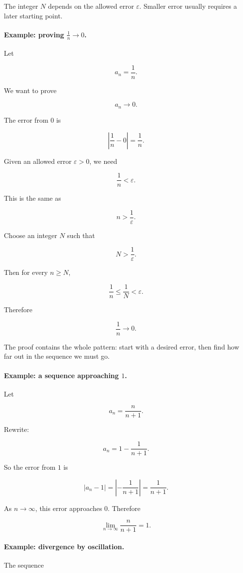 The integer \(N\) depends on the allowed error \(\varepsilon\).  Smaller error usually
requires a later starting point.

\paragraph{Example: proving \(\frac1n\to0\).}
Let

\[
a_n=\frac1n.
\]

We want to prove

\[
a_n\to0.
\]

The error from \(0\) is

\[
\left|\frac1n-0\right|=\frac1n.
\]

Given an allowed error \(\varepsilon>0\), we need

\[
\frac1n<\varepsilon.
\]

This is the same as

\[
n>\frac1\varepsilon.
\]

Choose an integer \(N\) such that

\[
N>\frac1\varepsilon.
\]

Then for every \(n\ge N\),

\[
\frac1n\le \frac1N<\varepsilon.
\]

Therefore

\[
\boxed{
\frac1n\to0.
}
\]

The proof contains the whole pattern: start with a desired error, then find how far out
in the sequence we must go.

\paragraph{Example: a sequence approaching \(1\).}
Let

\[
a_n=\frac{n}{n+1}.
\]

Rewrite:

\[
a_n=1-\frac1{n+1}.
\]

So the error from \(1\) is

\[
|a_n-1|
=
\left|-\frac1{n+1}\right|
=
\frac1{n+1}.
\]

As \(n\to\infty\), this error approaches \(0\).  Therefore

\[
\boxed{
\lim_{n\to\infty}\frac{n}{n+1}=1.
}
\]

\paragraph{Example: divergence by oscillation.}
The sequence

